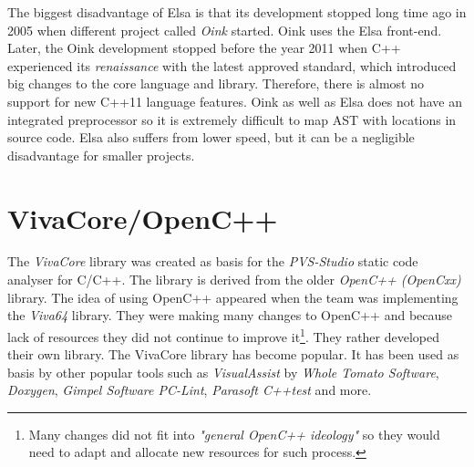 The biggest disadvantage of Elsa is that its development stopped long time ago in 2005 when different project called \emph{Oink} \cite{oink} started. Oink uses the Elsa front-end. Later, the Oink development stopped before the year 2011 when C++ experienced its \textit{renaissance} with the latest approved standard, which introduced big changes to the core language and library. Therefore, there is almost no support for new C++11 language features. Oink as well as Elsa does not have an integrated preprocessor so it is extremely difficult to map AST with locations in source code. Elsa also suffers from lower speed, but it can be a negligible disadvantage for smaller projects.

\section{VivaCore/OpenC++}
The \emph{VivaCore} \cite{vivacore} library was created as basis for the \emph{PVS-Studio} \cite{pvs-studio} static code analyser for C/C++. The library is derived from the older \emph{OpenC++ (OpenCxx)} \cite{opencxx} library. The idea of using OpenC++ appeared when the team was implementing the \emph{Viva64} \cite{vivacore} library. They were making many changes to OpenC++ and because lack of resources they did not continue to improve it\footnote{Many changes did not fit into \textit{"general OpenC++ ideology"} \cite{vivacore-ideology} so they would need to adapt and allocate new resources for such process.}. They rather developed their own library. The VivaCore library has become popular. It has been used as basis by other popular tools such as  \emph{VisualAssist} by \emph{Whole Tomato Software}, \emph{Doxygen}, \emph{Gimpel Software PC-Lint}, \emph{Parasoft C++test} and more.


